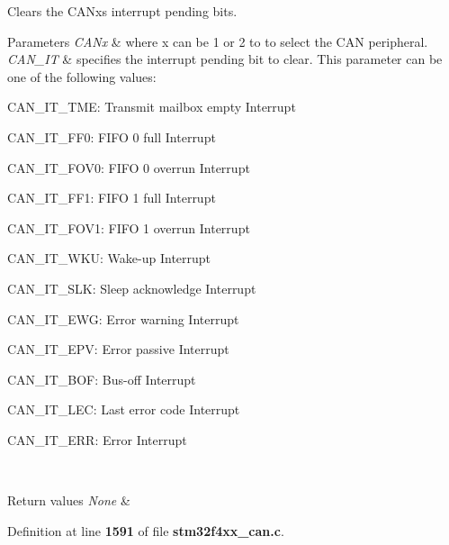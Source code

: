 Clears the C\+A\+Nx\textquotesingle{}s interrupt pending bits. 


\begin{DoxyParams}{Parameters}
{\em C\+A\+Nx} & where x can be 1 or 2 to to select the C\+AN peripheral. \\
\hline
{\em C\+A\+N\+\_\+\+IT} & specifies the interrupt pending bit to clear. This parameter can be one of the following values\+: \begin{DoxyItemize}
\item C\+A\+N\+\_\+\+I\+T\+\_\+\+T\+ME\+: Transmit mailbox empty Interrupt \item C\+A\+N\+\_\+\+I\+T\+\_\+\+F\+F0\+: F\+I\+FO 0 full Interrupt \item C\+A\+N\+\_\+\+I\+T\+\_\+\+F\+O\+V0\+: F\+I\+FO 0 overrun Interrupt \item C\+A\+N\+\_\+\+I\+T\+\_\+\+F\+F1\+: F\+I\+FO 1 full Interrupt \item C\+A\+N\+\_\+\+I\+T\+\_\+\+F\+O\+V1\+: F\+I\+FO 1 overrun Interrupt \item C\+A\+N\+\_\+\+I\+T\+\_\+\+W\+KU\+: Wake-\/up Interrupt \item C\+A\+N\+\_\+\+I\+T\+\_\+\+S\+LK\+: Sleep acknowledge Interrupt \item C\+A\+N\+\_\+\+I\+T\+\_\+\+E\+WG\+: Error warning Interrupt \item C\+A\+N\+\_\+\+I\+T\+\_\+\+E\+PV\+: Error passive Interrupt \item C\+A\+N\+\_\+\+I\+T\+\_\+\+B\+OF\+: Bus-\/off Interrupt \item C\+A\+N\+\_\+\+I\+T\+\_\+\+L\+EC\+: Last error code Interrupt \item C\+A\+N\+\_\+\+I\+T\+\_\+\+E\+RR\+: Error Interrupt \end{DoxyItemize}
\\
\hline
\end{DoxyParams}

\begin{DoxyRetVals}{Return values}
{\em None} & \\
\hline
\end{DoxyRetVals}


Definition at line \textbf{ 1591} of file \textbf{ stm32f4xx\+\_\+can.\+c}.


